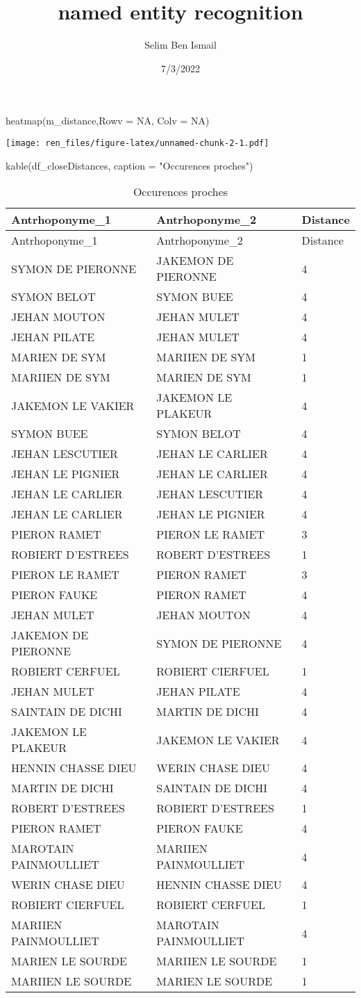 \documentclass[
]{article}
\title{named entity recognition}
\author{Selim Ben Ismail}
\date{7/3/2022}
\newenvironment{Shaded}{\begin{snugshade}}{\end{snugshade}}
\newcommand{\AttributeTok}[1]{\textcolor[rgb]{0.77,0.63,0.00}{#1}}
\newcommand{\ConstantTok}[1]{\textcolor[rgb]{0.00,0.00,0.00}{#1}}
\newcommand{\FunctionTok}[1]{\textcolor[rgb]{0.00,0.00,0.00}{#1}}
\newcommand{\NormalTok}[1]{#1}
\newcommand{\StringTok}[1]{\textcolor[rgb]{0.31,0.60,0.02}{#1}}
\begin{document}
\maketitle

\begin{Shaded}
\begin{Highlighting}[]
\FunctionTok{heatmap}\NormalTok{(m\_distance,}\AttributeTok{Rowv =} \ConstantTok{NA}\NormalTok{, }\AttributeTok{Colv =} \ConstantTok{NA}\NormalTok{)}
\end{Highlighting}
\end{Shaded}

\texttt{[image: ren\_files/figure-latex/unnamed-chunk-2-1.pdf]}

\begin{Shaded}
\begin{Highlighting}[]
\FunctionTok{kable}\NormalTok{(df\_closeDistances, }\AttributeTok{caption =} \StringTok{"Occurences proches"}\NormalTok{)}
\end{Highlighting}
\end{Shaded}

\begin{longtable}[]{@{}lll@{}}
\caption{Occurences proches}\tabularnewline
\toprule
Antrhoponyme\_1 & Antrhoponyme\_2 & Distance\tabularnewline
\midrule
\endfirsthead
\toprule
Antrhoponyme\_1 & Antrhoponyme\_2 & Distance\tabularnewline
\midrule
\endhead
SYMON DE PIERONNE & JAKEMON DE PIERONNE & 4\tabularnewline
SYMON BELOT & SYMON BUEE & 4\tabularnewline
JEHAN MOUTON & JEHAN MULET & 4\tabularnewline
JEHAN PILATE & JEHAN MULET & 4\tabularnewline
MARIEN DE SYM & MARIIEN DE SYM & 1\tabularnewline
MARIIEN DE SYM & MARIEN DE SYM & 1\tabularnewline
JAKEMON LE VAKIER & JAKEMON LE PLAKEUR & 4\tabularnewline
SYMON BUEE & SYMON BELOT & 4\tabularnewline
JEHAN LESCUTIER & JEHAN LE CARLIER & 4\tabularnewline
JEHAN LE PIGNIER & JEHAN LE CARLIER & 4\tabularnewline
JEHAN LE CARLIER & JEHAN LESCUTIER & 4\tabularnewline
JEHAN LE CARLIER & JEHAN LE PIGNIER & 4\tabularnewline
PIERON RAMET & PIERON LE RAMET & 3\tabularnewline
ROBIERT D'ESTREES & ROBERT D'ESTREES & 1\tabularnewline
PIERON LE RAMET & PIERON RAMET & 3\tabularnewline
PIERON FAUKE & PIERON RAMET & 4\tabularnewline
JEHAN MULET & JEHAN MOUTON & 4\tabularnewline
JAKEMON DE PIERONNE & SYMON DE PIERONNE & 4\tabularnewline
ROBIERT CERFUEL & ROBIERT CIERFUEL & 1\tabularnewline
JEHAN MULET & JEHAN PILATE & 4\tabularnewline
SAINTAIN DE DICHI & MARTIN DE DICHI & 4\tabularnewline
JAKEMON LE PLAKEUR & JAKEMON LE VAKIER & 4\tabularnewline
HENNIN CHASSE DIEU & WERIN CHASE DIEU & 4\tabularnewline
MARTIN DE DICHI & SAINTAIN DE DICHI & 4\tabularnewline
ROBERT D'ESTREES & ROBIERT D'ESTREES & 1\tabularnewline
PIERON RAMET & PIERON FAUKE & 4\tabularnewline
MAROTAIN PAINMOULLIET & MARIIEN PAINMOULLIET & 4\tabularnewline
WERIN CHASE DIEU & HENNIN CHASSE DIEU & 4\tabularnewline
ROBIERT CIERFUEL & ROBIERT CERFUEL & 1\tabularnewline
MARIIEN PAINMOULLIET & MAROTAIN PAINMOULLIET & 4\tabularnewline
MARIEN LE SOURDE & MARIIEN LE SOURDE & 1\tabularnewline
MARIIEN LE SOURDE & MARIEN LE SOURDE & 1\tabularnewline
\bottomrule
\end{longtable}
\end{document}
